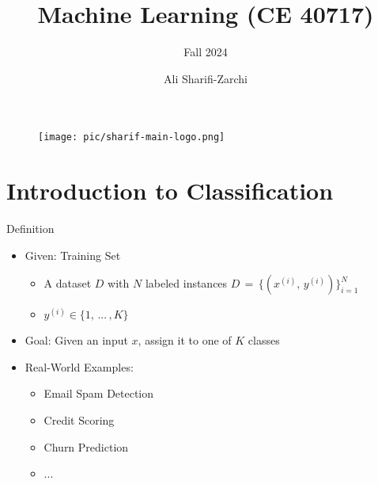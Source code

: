 \documentclass[serif, aspectratio=169]{beamer}
\author{Ali Sharifi-Zarchi}
\title{Machine Learning (CE 40717)}
\subtitle{Fall 2024}
\institute{
    CE Department \\
    Sharif University of Technology
}
\begin{document}
\begin{frame}
    \titlepage
    \vspace*{-0.6cm}
    \begin{figure}[htpb]
        \begin{center}
            \texttt{[image: pic/sharif-main-logo.png]}
        \end{center}
    \end{figure}
\end{frame}

\begin{frame}    
\tableofcontents[sectionstyle=show,
subsectionstyle=show/shaded/hide,
subsubsectionstyle=show/shaded/hide]
\end{frame}

\section{Introduction to Classification}
\begin{frame}{Definition}
    \begin{itemize}\itemsep2em
        \item Given: Training Set
        \begin{itemize}
            \item A dataset \(D\) with \(N\) labeled instances \(D \, = \, \{(x^{(i)}, \, y^{(i)})\}^N_{i=1}\)
            \item $y^{(i)} \in \{1, \, ... \, , K\}$
        \end{itemize}
        \item Goal: Given an input $x$, assign it to one of $K$ classes
        \item Real-World Examples:
        \begin{itemize}
            \item Email Spam Detection
            \item Credit Scoring
            \item Churn Prediction
            \item ...
        \end{itemize}
    \end{itemize}
\end{frame}
\end{document}
